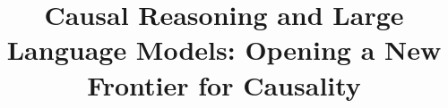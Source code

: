 \documentclass{beamer}
\begin{document}
\title[]{Causal Reasoning and Large Language Models: Opening a New Frontier for Causality}
\author {}
\date{}
\maketitle


\end{document}
